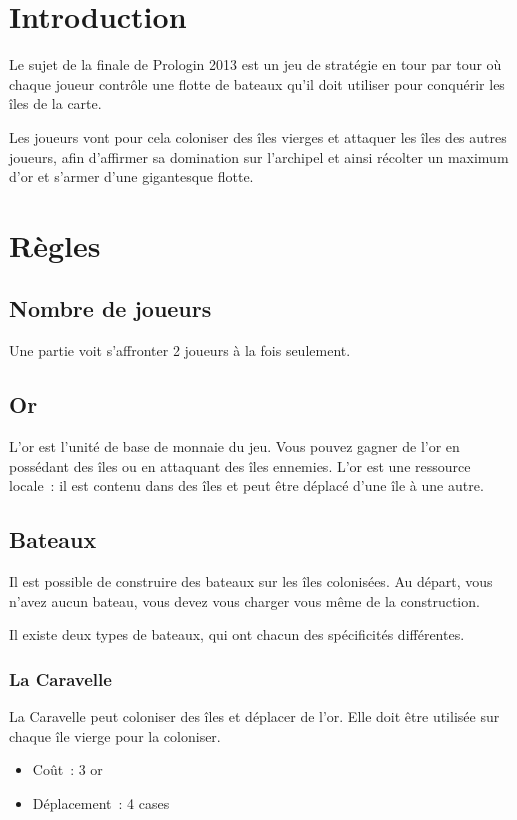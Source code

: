 
\section{Introduction}
Le sujet de la finale de Prologin 2013 est un jeu de stratégie en tour par tour
où chaque joueur contrôle une flotte de bateaux qu'il doit utiliser pour
conquérir les îles de la carte.

Les joueurs vont pour cela coloniser des îles vierges et attaquer les îles des
autres joueurs, afin d'affirmer sa domination sur l'archipel et ainsi récolter
un maximum d'or et s'armer d'une gigantesque flotte.

\section{Règles}
\subsection{Nombre de joueurs}
Une partie voit s'affronter 2 joueurs à la fois seulement.

\subsection{Or}
L'or est l'unité de base de monnaie du jeu. Vous pouvez gagner de l'or en
possédant des îles ou en attaquant des îles ennemies.
L'or est une ressource locale~: il est contenu dans des îles et peut être
déplacé d'une île à une autre.

\subsection{Bateaux}
Il est possible de construire des bateaux sur les îles colonisées.
Au départ, vous n'avez aucun bateau, vous devez vous charger vous même de la
construction.

Il existe deux types de bateaux, qui ont chacun des spécificités différentes.

\subsubsection{La Caravelle}
La Caravelle peut coloniser des îles et déplacer de l'or. Elle doit être
utilisée sur chaque île vierge pour la coloniser.
\begin{itemize}
	\item Coût~: 3 or
	\item Déplacement~: 4 cases
\end{itemize}

